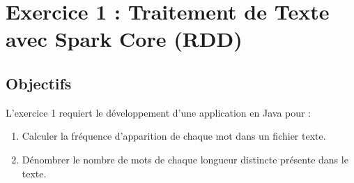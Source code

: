 \documentclass[11pt,a4paper]{article}
\begin{document}
\section{Exercice 1 : Traitement de Texte avec Spark Core (RDD)}

\subsection{Objectifs}
L'exercice 1 requiert le développement d'une application en Java pour :
\begin{enumerate}
    \item Calculer la fréquence d'apparition de chaque mot dans un fichier texte.
    \item Dénombrer le nombre de mots de chaque longueur distincte présente dans le texte.
\end{enumerate}
\end{document}
